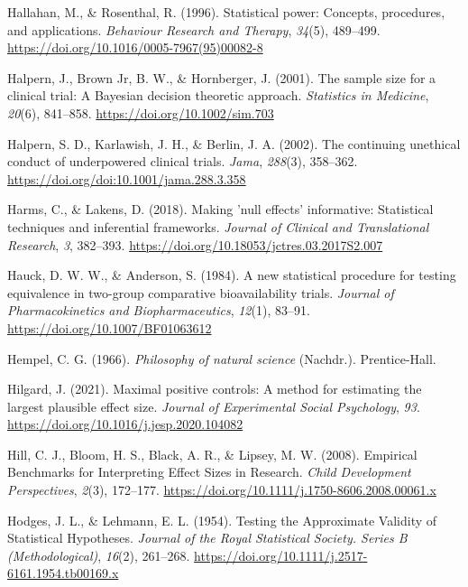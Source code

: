 \documentclass[
  letterpaper,
  DIV=11,
  numbers=noendperiod]{scrreprt}
\newlength{\cslhangindent}
\newlength{\cslentryspacingunit} %
\newenvironment{CSLReferences}[2] %
 {%
  \setlength{\parindent}{0pt}
  \ifodd #1
  \let\oldpar\par
  \def\par{\hangindent=\cslhangindent\oldpar}
  \fi
  \setlength{\parskip}{#2\cslentryspacingunit}
 }%
 {}
\begin{document}
\begin{CSLReferences}{1}{0}
\leavevmode{}%
Hallahan, M., \& Rosenthal, R. (1996). Statistical power: {Concepts},
procedures, and applications. \emph{Behaviour Research and Therapy},
\emph{34}(5), 489--499.
\url{https://doi.org/10.1016/0005-7967(95)00082-8}

\leavevmode{}%
Halpern, J., Brown Jr, B. W., \& Hornberger, J. (2001). The sample size
for a clinical trial: {A Bayesian} decision theoretic approach.
\emph{Statistics in Medicine}, \emph{20}(6), 841--858.
\url{https://doi.org/10.1002/sim.703}

\leavevmode{}%
Halpern, S. D., Karlawish, J. H., \& Berlin, J. A. (2002). The
continuing unethical conduct of underpowered clinical trials.
\emph{Jama}, \emph{288}(3), 358--362.
\url{https://doi.org/doi:10.1001/jama.288.3.358}

\leavevmode{}%
Harms, C., \& Lakens, D. (2018). Making 'null effects' informative:
Statistical techniques and inferential frameworks. \emph{Journal of
Clinical and Translational Research}, \emph{3}, 382--393.
\url{https://doi.org/10.18053/jctres.03.2017S2.007}

\leavevmode{}%
Hauck, D. W. W., \& Anderson, S. (1984). A new statistical procedure for
testing equivalence in two-group comparative bioavailability trials.
\emph{Journal of Pharmacokinetics and Biopharmaceutics}, \emph{12}(1),
83--91. \url{https://doi.org/10.1007/BF01063612}

\leavevmode{}%
Hempel, C. G. (1966). \emph{Philosophy of natural science} (Nachdr.).
{Prentice-Hall}.

\leavevmode{}%
Hilgard, J. (2021). Maximal positive controls: {A} method for estimating
the largest plausible effect size. \emph{Journal of Experimental Social
Psychology}, \emph{93}. \url{https://doi.org/10.1016/j.jesp.2020.104082}

\leavevmode{}%
Hill, C. J., Bloom, H. S., Black, A. R., \& Lipsey, M. W. (2008).
Empirical {Benchmarks} for {Interpreting Effect Sizes} in {Research}.
\emph{Child Development Perspectives}, \emph{2}(3), 172--177.
\url{https://doi.org/10.1111/j.1750-8606.2008.00061.x}

\leavevmode{}%
Hodges, J. L., \& Lehmann, E. L. (1954). Testing the {Approximate
Validity} of {Statistical Hypotheses}. \emph{Journal of the Royal
Statistical Society. Series B (Methodological)}, \emph{16}(2), 261--268.
\url{https://doi.org/10.1111/j.2517-6161.1954.tb00169.x}


\end{CSLReferences}
\end{document}
